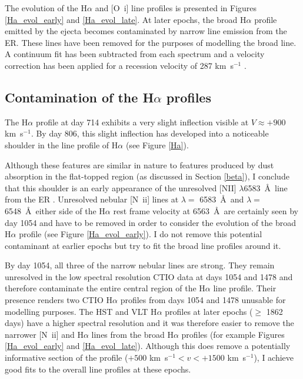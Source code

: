 The evolution of the H$\alpha$ and [O~{\sc i}] line profiles is presented 
in Figures \ref{Ha_evol_early} and \ref{Ha_evol_late}.  At later epochs, 
the broad H$\alpha$ profile emitted by the ejecta becomes contaminated by 
narrow line emission from the ER.  These lines have been 
removed for the purposes of modelling the broad line. A continuum fit has 
been subtracted from each spectrum and a velocity correction has been 
applied for a recession velocity of 287 km~s$^{-1}$ 
\citep{Groningsson2008}.




\subsection{Contamination of the H$\alpha$ profiles}

The H$\alpha$ profile at day 714 exhibits a very slight inflection visible 
at $V \approx +900$ km~s$^{-1}$.  By day 806, this slight inflection has 
developed into a noticeable shoulder in the line profile of H$\alpha$ (see 
Figure \ref{Ha}).




Although these features are similar in nature to features produced by dust 
absorption in the flat-topped region (as discussed in Section \ref{beta}), 
I conclude that this shoulder is an early appearance of the unresolved 
[NII] $\lambda$6583~\AA\ line from the ER \citep{Kozma1998b}.  Unresolved nebular [N~{\sc ii}] lines at $\lambda=$ 6583~\AA\ and 
$\lambda=$ 6548~\AA\ either side of the H$\alpha$ rest frame velocity at 
6563~\AA\ are certainly seen by day 1054 
and have to be removed in order to consider the evolution of the broad 
H$\alpha$ profile (see Figure \ref{Ha_evol_early}). I do not remove this 
potential contaminant at earlier epochs but try to fit the broad line 
profiles around it.





 
By day 1054, all three of the narrow nebular lines are strong.  They 
remain unresolved in the low spectral resolution CTIO data at days 1054 
and 1478 and therefore contaminate the entire central region of the 
H$\alpha$ line profile.  Their presence renders two CTIO H$\alpha$ 
profiles from days 1054 and 1478 unusable for modelling purposes.  The HST 
and VLT H$\alpha$ profiles at later epochs ($\ge$ 1862 days) have a higher 
spectral resolution and it was therefore easier to remove the narrower 
[N~{\sc ii}] and H$\alpha$ lines from the broad H$\alpha$ profiles (for 
example Figures \ref{Ha_evol_early} and \ref{Ha_evol_late}). Although this 
does remove a potentially informative section of the profile ($+500$ 
km~s$^{-1}<v<+1500$ km~s$^{-1}$), I achieve good fits to the overall line 
profiles at these epochs.

